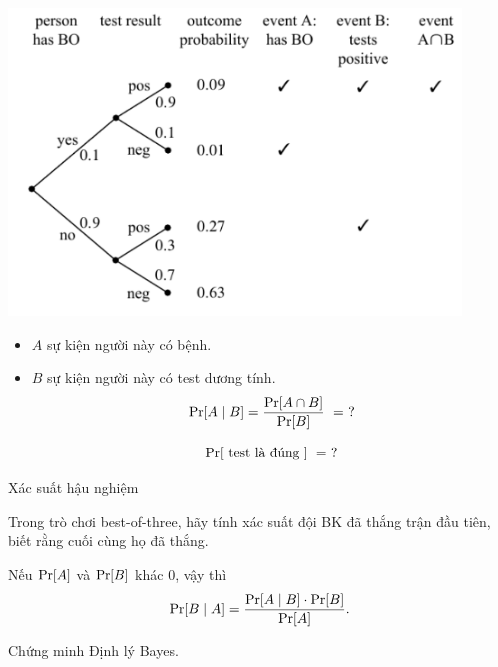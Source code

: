 \begin{frame}
  \begin{block}{}
    \begin{center}
      \includegraphics[width=0.9\textwidth]{fig1714.pdf}
    \end{center}
  \end{block}
\end{frame}

\begin{frame}
  \begin{itemize}
  \item $A$ sự kiện  người này  có bệnh.
  \item $B$ sự kiện người này có test dương tính.
$$  
\mathrm{Pr}[A \mid B] = \frac{\mathrm{Pr}[A \cap B]}{\mathrm{Pr}[B]}\ =\ ?
$$

$$
\pr[\text{ test là đúng }]\ =\  ?
$$
  \end{itemize}
\end{frame}

\begin{frame}{Xác suất hậu nghiệm}
  \begin{xrcs}
    Trong trò chơi best-of-three, hãy tính xác suất đội BK đã thắng trận đầu tiên, biết rằng cuối cùng họ đã thắng. 
  \end{xrcs}

\end{frame}


\begin{frame}
  \begin{thrm}[Bayes]
    Nếu $\mathrm{Pr}[A]$ và $\mathrm{Pr}[B]$ khác $0$, vậy thì 
    $$
    \mathrm{Pr}[B \mid A ] = \frac{\mathrm{Pr}[A \mid B ]\cdot \mathrm{Pr}[B]}{\mathrm{Pr}[A]}.
    $$
  \end{thrm}
  \begin{xrcs}
    Chứng minh Định lý Bayes.
  \end{xrcs}

\end{frame}

